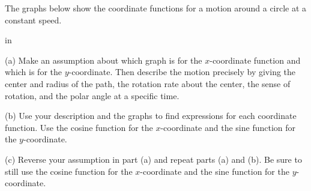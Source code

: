 \documentclass{ximera}
\newcommand{\pskip}{\vskip 0.1 in}
\begin{document}
\begin{example} \label{Ex3:Graphs}
The graphs below show the coordinate functions for a motion around a circle at a constant speed. 

\pskip


(a) Make an assumption about which graph is for the $x$-coordinate function and which is for the $y$-coordinate. Then describe the motion precisely by giving the center and radius of the path, the rotation rate about the center, the sense of rotation, and the polar angle at a specific time.

(b) Use your description and the graphs to find expressions for each coordinate function. Use the cosine function for the $x$-coordinate and the sine function for the $y$-coordinate.

(c) Reverse  your assumption in part (a) and repeat parts (a) and (b). Be sure to still use the cosine function for the $x$-coordinate and the sine function for the $y$-coordinate.


\begin{exploration}
 
\begin{onlineOnly}
    \begin{center}
\end{center}
\end{onlineOnly}
\end{exploration}

\end{example}
\end{document}
